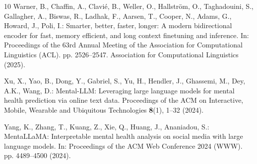 \documentclass[runningheads]{llncs}
\begin{document}
\begin{thebibliography}{10}
Warner, B., Chaffin, A., Clavi{\'e}, B., Weller, O., Hallstr{\"o}m, O.,
  Taghadouini, S., Gallagher, A., Biswas, R., Ladhak, F., Aarsen, T., Cooper,
  N., Adams, G., Howard, J., Poli, I.: Smarter, better, faster, longer: A
  modern bidirectional encoder for fast, memory efficient, and long context
  finetuning and inference. In: Proceedings of the 63rd Annual Meeting of the
  Association for Computational Linguistics (ACL). pp. 2526--2547. Association
  for Computational Linguistics (2025). 

Xu, X., Yao, B., Dong, Y., Gabriel, S., Yu, H., Hendler, J., Ghassemi, M., Dey,
  A.K., Wang, D.: Mental-{LLM}: Leveraging large language models for mental
  health prediction via online text data. Proceedings of the ACM on
  Interactive, Mobile, Wearable and Ubiquitous Technologies  \textbf{8}(1),
  1--32 (2024). 

Yang, K., Zhang, T., Kuang, Z., Xie, Q., Huang, J., Ananiadou, S.:
  Menta{LL}a{MA}: Interpretable mental health analysis on social media with
  large language models. In: Proceedings of the ACM Web Conference 2024 (WWW).
  pp. 4489--4500 (2024). 

\end{thebibliography}
\end{document}

